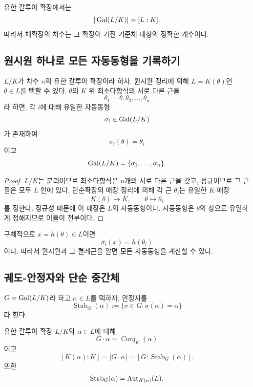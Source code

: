 \begin{corollary}
유한 갈루아 확장에서는
\[
  |\operatorname{Gal}(L/K)|=[L:K].
\]
따라서 체확장의 차수는 그 확장이 가진 기준체 대칭의 정확한 개수이다.
\end{corollary}

\subsection{원시원 하나로 모든 자동동형을 기록하기}

\begin{theorem}
$L/K$가 차수 $n$의 유한 갈루아 확장이라 하자. 원시원 정리에 의해 $L=K(\theta)$인 $\theta\in L$를 택할 수 있다. $\theta$의 $K$ 위 최소다항식의 서로 다른 근을
\[
  \theta_1=\theta,\theta_2,\dots,\theta_n
\]
라 하면, 각 $i$에 대해 유일한 자동동형
\[
  \sigma_i\in\operatorname{Gal}(L/K)
\]
가 존재하여
\[
  \sigma_i(\theta)=\theta_i
\]
이고
\[
  \operatorname{Gal}(L/K)=\{\sigma_1,\dots,\sigma_n\}.
\]
\end{theorem}

\begin{proof}
$L/K$는 분리이므로 최소다항식은 $n$개의 서로 다른 근을 갖고, 정규이므로 그 근들은 모두 $L$ 안에 있다. 단순확장의 매장 정리에 의해 각 근 $\theta_i$는 유일한 $K$-매장
\[
  K(\theta)\longrightarrow\overline K,
  \qquad
  \theta\longmapsto\theta_i
\]
를 정한다. 정규성 때문에 이 매장은 $L$의 자동동형이다. 자동동형은 $\theta$의 상으로 유일하게 정해지므로 이들이 전부이다.
\end{proof}

\begin{remark}
구체적으로 $x=h(\theta)\in L$이면
\[
  \sigma_i(x)=h(\theta_i)
\]
이다. 따라서 원시원과 그 켤레근을 알면 모든 자동동형을 계산할 수 있다.
\end{remark}

\subsection{궤도-안정자와 단순 중간체}

$G=\operatorname{Gal}(L/K)$라 하고 $\alpha\in L$를 택하자. 안정자를
\[
  \operatorname{Stab}_G(\alpha)
  :=\{\sigma\in G:\sigma(\alpha)=\alpha\}
\]
라 한다.

\begin{proposition}
유한 갈루아 확장 $L/K$와 $\alpha\in L$에 대해
\[
  G\cdot\alpha
  =\operatorname{Conj}_K(\alpha)
\]
이고
\[
  [K(\alpha):K]
  =|G\cdot\alpha|
  =[G:\operatorname{Stab}_G(\alpha)].
\]
또한
\[
  \operatorname{Stab}_G(\alpha)
  =\operatorname{Aut}_{K(\alpha)}(L).
\]
\end{proposition}

